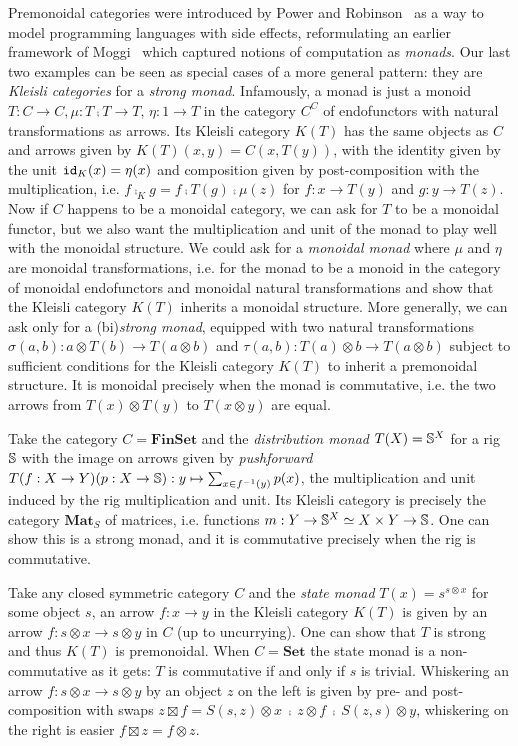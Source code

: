 Premonoidal categories were introduced by Power and Robinson~\cite{PowerRobinson97} as a way to model programming languages with side effects, reformulating an earlier framework of Moggi~\cite{Moggi91} which captured notions of computation as \emph{monads}.
Our last two examples can be seen as special cases of a more general pattern: they are \emph{Kleisli categories} for a \emph{strong monad}.
Infamously, a monad is just a monoid $T : C \to C, \mu : T \fcmp T \to T$, $\eta : 1 \to T$ in the category $C^C$ of endofunctors with natural transformations as arrows.
Its Kleisli category $K(T)$ has the same objects as $C$ and arrows given by $K(T)(x, y) = C(x, T(y))$, with the identity given by the unit $\id_K(x) = \eta(x)$ and composition given by post-composition with the multiplication, i.e. $f \fcmp_K g = f \fcmp T(g) \fcmp \mu(z)$ for $f : x \to T(y)$ and $g : y \to T(z)$.
Now if $C$ happens to be a monoidal category, we can ask for $T$ to be a monoidal functor, but we also want the multiplication and unit of the monad to play well with the monoidal structure.
We could ask for a \emph{monoidal monad} where $\mu$ and $\eta$ are monoidal transformations, i.e. for the monad to be a monoid in the category of monoidal endofunctors and monoidal natural transformations and show that the Kleisli category $K(T)$ inherits a monoidal structure.
More generally, we can ask only for a (bi)\emph{strong monad}, equipped with two natural transformations $\sigma(a, b) : a \otimes T(b) \to T(a \otimes b)$ and $\tau(a, b) : T(a) \otimes b \to T(a \otimes b)$ subject to sufficient conditions for the Kleisli category $K(T)$ to inherit a premonoidal structure.
It is monoidal precisely when the monad is commutative, i.e. the two arrows from $T(x) \otimes T(y)$ to $T(x \otimes y)$ are equal.

\begin{example}
Take the category $C = \mathbf{FinSet}$ and the \emph{distribution monad} $T(X) = \S^X$ for a rig $\S$ with the image on arrows given by \emph{pushforward} $T(f : X \to Y)(p : X \to \S) : y \mapsto \sum_{x \in f^{-1}(y)} p(x)$, the multiplication and unit induced by the rig multiplication and unit.
Its Kleisli category is precisely the category $\mathbf{Mat}_S$ of matrices, i.e. functions $m : Y \to \S^X \simeq X \times Y \to \S$.
One can show this is a strong monad, and it is commutative precisely when the rig is commutative.
\end{example}

\begin{example}
Take any closed symmetric category $C$ and the \emph{state monad} $T(x) = s^{s \otimes x}$ for some object $s$, an arrow $f : x \to y$ in the Kleisli category $K(T)$ is given by an arrow $f : s \otimes x \to s \otimes y$ in $C$ (up to uncurrying).
One can show that $T$ is strong and thus $K(T)$ is premonoidal.
When $C = \mathbf{Set}$ the state monad is a non-commutative as it gets: $T$ is commutative if and only if $s$ is trivial.
Whiskering an arrow $f : s \otimes x \to s \otimes y$ by an object $z$ on the left is given by pre- and post-composition with swaps $z \boxtimes f = S(s, z) \otimes x \ \fcmp \ z \otimes f \ \fcmp \ S(z, s) \otimes y$, whiskering on the right is easier $f \boxtimes z = f \otimes z$.
\end{example}


